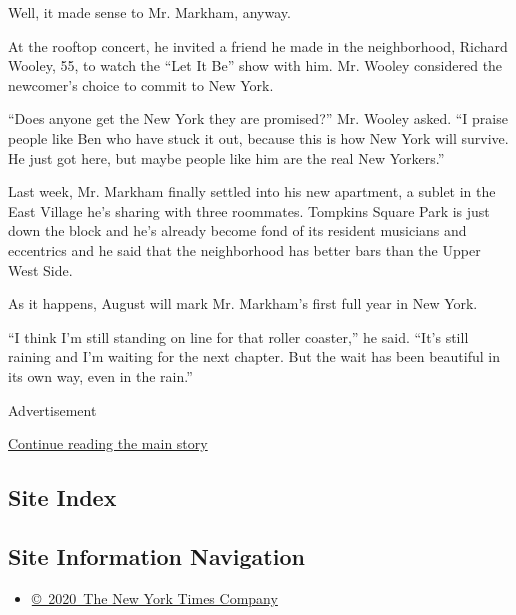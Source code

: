 Well, it made sense to Mr. Markham, anyway.

At the rooftop concert, he invited a friend he made in the neighborhood,
Richard Wooley, 55, to watch the ``Let It Be'' show with him. Mr. Wooley
considered the newcomer's choice to commit to New York.

``Does anyone get the New York they are promised?'' Mr. Wooley asked.
``I praise people like Ben who have stuck it out, because this is how
New York will survive. He just got here, but maybe people like him are
the real New Yorkers.''

Last week, Mr. Markham finally settled into his new apartment, a sublet
in the East Village he's sharing with three roommates. Tompkins Square
Park is just down the block and he's already become fond of its resident
musicians and eccentrics and he said that the neighborhood has better
bars than the Upper West Side.

As it happens, August will mark Mr. Markham's first full year in New
York.

``I think I'm still standing on line for that roller coaster,'' he said.
``It's still raining and I'm waiting for the next chapter. But the wait
has been beautiful in its own way, even in the rain.''

Advertisement

\protect\hyperlink{after-bottom}{Continue reading the main story}

\hypertarget{site-index}{%
\subsection{Site Index}\label{site-index}}

\hypertarget{site-information-navigation}{%
\subsection{Site Information
Navigation}\label{site-information-navigation}}

\begin{itemize}
\tightlist
\item
  \href{https://help.nytimes.com/hc/en-us/articles/115014792127-Copyright-notice}{©~2020~The
  New York Times Company}
\end{itemize}

